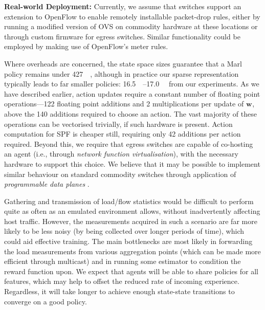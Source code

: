 \documentclass[conference, letterpaper, 10pt, times]{IEEEtran}
\newcommand{\wvec}[1]{\ensuremath{\bm{w}_{#1}}}
\newcommand{\fakepara}[1]{\noindent\textbf{#1:}}
\begin{document}
\fakepara{Real-world Deployment}
Currently, we assume that switches support an extension to OpenFlow to enable remotely installable packet-drop rules, either by running a modified version of OVS on commodity hardware at these locations or through custom firmware for egress switches.
Similar functionality could be employed by making use of OpenFlow's meter rules.

Where overheads are concerned, the state space sizes guarantee that a Marl policy remains under \SI{427}{\kibi\byte}, although in practice our sparse representation typically leads to far smaller policies: \SIrange{16.5}{17.0}{\kibi\byte} from our experiments.
As we have described earlier, action updates require a constant number of floating point operations---\num{122} floating point additions and \num{2} multiplications per update of $\wvec{}$, above the \num{140} additions required to choose an action.
The vast majority of these operations can be vectorised trivially, if such hardware is present.
Action computation for SPF is cheaper still, requiring only \num{42} additions per action required.
Beyond this, we require that egress switches are capable of co-hosting an agent (i.e., through \emph{network function virtualisation}), with the necessary hardware to support this choice.
We believe that it may be possible to implement similar behaviour on standard commodity switches through application of \emph{programmable data planes} \cite{DBLP:conf/ancs/JouetP17}.

Gathering and transmission of load/flow statistics would be difficult to perform quite as often as an emulated environment allows, without inadvertently affecting host traffic.
However, the measurements acquired in such a scenario are far more likely to be less noisy (by being collected over longer periods of time), which could aid effective training.
The main bottlenecks are most likely in forwarding the load measurements from various aggregation points (which can be made more efficient through multicast) and in running some estimator to condition the reward function upon.
We expect that agents will be able to share policies for all features, which may help to offset the reduced rate of incoming experience.
Regardless, it will take longer to achieve enough state-state transitions to converge on a good policy.
\end{document}
